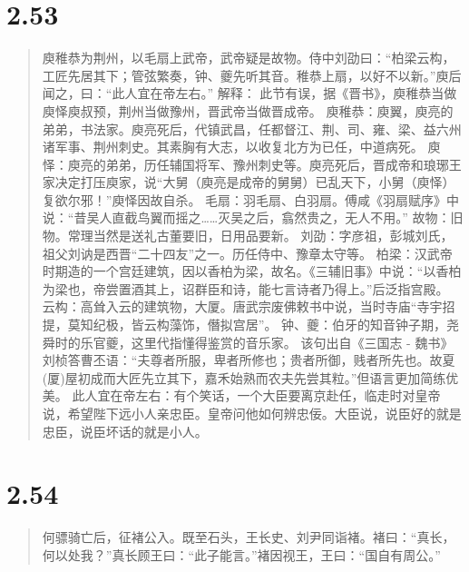 \documentclass[]{book}
\begin{document}
\section{2.53}\label{section-99}

\begin{quote}
庾稚恭为荆州，以毛扇上武帝，武帝疑是故物。侍中刘劭曰：``柏梁云构，工匠先居其下；管弦繁奏，钟、夔先听其音。稚恭上扇，以好不以新。''庾后闻之，曰：``此人宜在帝左右。''
解释：
此节有误，据《晋书》，庾稚恭当做庾怿庾叔预，荆州当做豫州，晋武帝当做晋成帝。
庾稚恭：庾翼，庾亮的弟弟，书法家。庾亮死后，代镇武昌，任都督江、荆、司、雍、梁、益六州诸军事、荆州刺史。其素胸有大志，以收复北方为已任，中道病死。
庾怿：庾亮的弟弟，历任辅国将军、豫州刺史等。庾亮死后，晋成帝和琅琊王家决定打压庾家，说``大舅（庾亮是成帝的舅舅）已乱天下，小舅（庾怿）复欲尔邪！''庾怿因故自杀。
毛扇：羽毛扇、白羽扇。傅咸《羽扇赋序》中说：``昔吴人直截鸟翼而摇之\ldots{}\ldots{}灭吴之后，翕然贵之，无人不用。''
故物：旧物。常理当然是送礼古董要旧，日用品要新。
刘劭：字彦祖，彭城刘氏，祖父刘讷是西晋``二十四友''之一。历任侍中、豫章太守等。
柏梁：汉武帝时期造的一个宫廷建筑，因以香柏为梁，故名。《三辅旧事》中说：``以香柏为梁也，帝尝置酒其上，诏群臣和诗，能七言诗者乃得上。''后泛指宫殿。
云构：高耸入云的建筑物，大厦。唐武宗废佛敕书中说，当时寺庙``寺宇招提，莫知纪极，皆云构藻饰，僭拟宫居''。
钟、夔：伯牙的知音钟子期，尧舜时的乐官夔，这里代指懂得鉴赏的音乐家。
该句出自《三国志 -
魏书》刘桢答曹丕语：``夫尊者所服，卑者所修也；贵者所御，贱者所先也。故夏(厦)屋初成而大匠先立其下，嘉禾始熟而农夫先尝其粒。''但语言更加简练优美。
此人宜在帝左右：有个笑话，一个大臣要离京赴任，临走时对皇帝说，希望陛下远小人亲忠臣。皇帝问他如何辨忠佞。大臣说，说臣好的就是忠臣，说臣坏话的就是小人。
\end{quote}

\section{2.54}\label{section-100}

\begin{quote}
何骠骑亡后，征褚公入。既至石头，王长史、刘尹同诣褚。褚曰：``真长，何以处我？''真长顾王曰：``此子能言。''褚因视王，王曰：``国自有周公。''
\end{quote}
\end{document}
